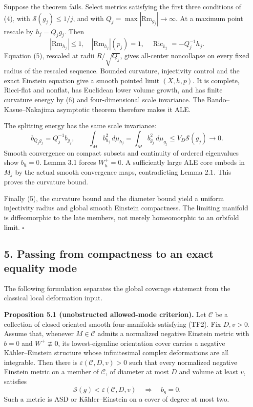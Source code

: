 \documentclass[
  11pt,
]{article}
\begin{document}
Suppose the theorem fails. Select metrics satisfying the first three
conditions of (4), with \(\mathscr S(g_j)\le1/j\), and with
\(Q_j=\max|\mathrm{Rm}_{g_j}|\to\infty\). At a maximum point rescale by
\(h_j=Q_jg_j\). Then \[
 |\mathrm{Rm}_{h_j}|\le1,\quad
 |\mathrm{Rm}_{h_j}|(p_j)=1,\quad
 \operatorname{Ric}_{h_j}=-Q_j^{-1}h_j.                     \tag{7}
\] Equation (5), rescaled at radii \(R/\sqrt{Q_j}\), gives all-center
noncollapse on every fixed radius of the rescaled sequence. Bounded
curvature, injectivity control and the exact Einstein equation give a
smooth pointed limit \((X,h,p)\). It is complete, Ricci-flat and
nonflat, has Euclidean lower volume growth, and has finite curvature
energy by (6) and four-dimensional scale invariance. The
Bando--Kasue--Nakajima asymptotic theorem therefore makes it ALE.

The splitting energy has the same scale invariance: \[
 b_{Q_jg_j}=Q_j^{-1}b_{g_j},\qquad
 \int_M b_{h_j}^2\,d\mu_{h_j}
   =\int_M b_{g_j}^2\,d\mu_{g_j}
   \le V_D\mathscr S(g_j)\longrightarrow0.                 \tag{8}
\] Smooth convergence on compact subsets and continuity of ordered
eigenvalues show \(b_h=0\). Lemma 3.1 forces \(W_h^+=0\). A sufficiently
large ALE core embeds in \(M_j\) by the actual smooth convergence maps,
contradicting Lemma 2.1. This proves the curvature bound.

Finally (5), the curvature bound and the diameter bound yield a uniform
injectivity radius and global smooth Einstein compactness. The limiting
manifold is diffeomorphic to the late members, not merely homeomorphic
to an orbifold limit. \(\square\)

\hypertarget{passing-from-compactness-to-an-exact-equality-mode}{%
\subsection{5. Passing from compactness to an exact equality
mode}\label{passing-from-compactness-to-an-exact-equality-mode}}

The following formulation separates the global coverage statement from
the classical local deformation input.

\textbf{Proposition 5.1 (unobstructed allowed-mode criterion).} Let
\(\mathcal C\) be a collection of closed oriented smooth four-manifolds
satisfying (TF2). Fix \(D,v>0\). Assume that, whenever
\(M\in\mathcal C\) admits a normalized negative Einstein metric with
\(b=0\) and \(W^+\not\equiv0\), its lowest-eigenline orientation cover
carries a negative Kähler--Einstein structure whose infinitesimal
complex deformations are all integrable. Then there is
\(\varepsilon(\mathcal C,D,v)>0\) such that every normalized negative
Einstein metric on a member of \(\mathcal C\), of diameter at most \(D\)
and volume at least \(v\), satisfies \[
 \mathscr S(g)<\varepsilon(\mathcal C,D,v)
                         \quad\Longrightarrow\quad b_g=0. \tag{9}
\] Such a metric is ASD or Kähler--Einstein on a cover of degree at most
two.
\end{document}
